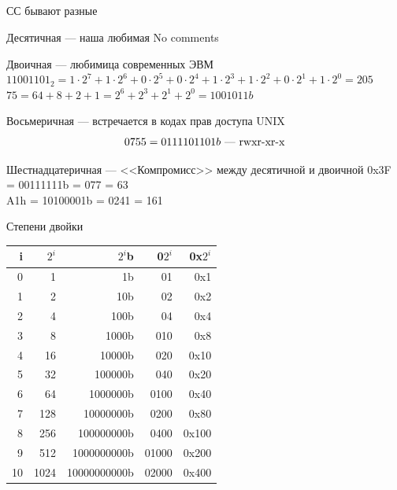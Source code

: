 \documentclass{beamer}
\begin{document}
    \subsection{}
    \begin{frame}{СС бывают разные}
        \begin{block}{Десятичная --- наша любимая}
            No comments
        \end{block}
        \begin{block}{Двоичная --- любимица современных ЭВМ}
        $11001101_2 = 1 \cdot 2^7 + 1 \cdot 2^6 + 0 \cdot 2^5 + 0 \cdot 2^4
            + 1 \cdot 2^3 + 1 \cdot 2^2 + 0 \cdot 2^1 + 1 \cdot 2^0 = 205$ \\
        $75 = 64 + 8 + 2 + 1 = 2^6 + 2^3 + 2^1 + 2^0 = 1001011b$
        \end{block}
        \begin{block}{Восьмеричная --- встречается в кодах прав доступа UNIX}
            $$
                0755 = 0111101101b \hbox{ --- rwxr-xr-x}
            $$
        \end{block}
        \begin{block}{Шестнадцатеричная --- <<Компромисс>> между десятичной и двоичной}
            0x3F = 00111111b = 077 = 63 \\
            A1h = 10100001b = 0241 = 161
        \end{block}
    \end{frame}
    \begin{frame}{Степени двойки}
        \begin{table}
            \begin{tabular}{|r|r|r|r|r|}
            \hline i  & $2^i$ & $2^i$b       & 0$2^i$ & 0x$2^i$ \\
            \hline 0  &  1    & 1b           & 01    & 0x1      \\
            \hline 1  &  2    & 10b          & 02    & 0x2      \\
            \hline 2  &  4    & 100b         & 04    & 0x4      \\
            \hline 3  &  8    & 1000b        & 010   & 0x8      \\
            \hline 4  &  16   & 10000b       & 020   & 0x10     \\
            \hline 5  &  32   & 100000b      & 040   & 0x20     \\
            \hline 6  &  64   & 1000000b     & 0100  & 0x40     \\
            \hline 7  &  128  & 10000000b    & 0200  & 0x80     \\
            \hline 8  &  256  & 100000000b   & 0400  & 0x100    \\
            \hline 9  &  512  & 1000000000b  & 01000 & 0x200    \\
            \hline 10 &  1024 & 10000000000b & 02000 & 0x400    \\
            \hline    
            \end{tabular}
        \end{table}
    \end{frame}
\end{document}
